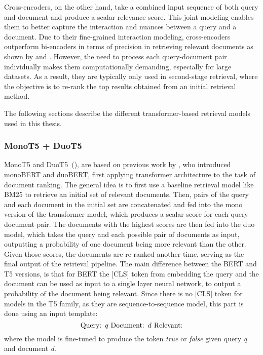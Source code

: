 Cross-encoders, on the other hand, take a combined input sequence of both query and document and produce a scalar relevance score.
This joint modeling enables them to better capture the interaction and nuances between a query and a document.
Due to their fine-grained interaction modeling, cross-encoders outperform bi-encoders in terms of precision in retrieving relevant documents as shown by \cite{thakur:2020:Augmented} and \cite{rosa:2022:In}.
However, the need to process each query-document pair individually makes them computationally demanding, especially for large datasets.
As a result, they are typically only used in second-stage retrieval, where the objective is to re-rank the top results obtained from an initial retrieval method.

The following sections describe the different transformer-based retrieval models used in this thesis.
\subsubsection{MonoT5 + DuoT5}\label{sec:monot5-duot5}
MonoT5 and DuoT5~(\cite{roberts:2019:Exploring}), are based on previous work by \cite{nogueira:2019:Multi}, who introduced monoBERT and duoBERT, first applying transformer architecture to the task of document ranking.
The general idea is to first use a baseline retrieval model like BM25 to retrieve an initial set of relevant documents.
Then, pairs of the query and each document in the initial set are concatenated and fed into the mono version of the transformer model, which produces a scalar score for each query-document pair.
The documents with the highest scores are then fed into the duo model, which takes the query and each possible pair of documents as input, outputting a probability of one document being more relevant than the other.
Given those scores, the documents are re-ranked another time, serving as the final output of the retrieval pipeline.
The main difference between the BERT and T5 versions, is that for BERT the [CLS] token from embedding the query and the document can be used as input to a single layer neural network, to output a probability of the document being relevant.
Since there is no [CLS] token for models in the T5 family, as they are sequence-to-sequence model, this part is done using an input template:
\begin{equation}
    \text{Query: \emph{q} Document: \emph{d} Relevant:}
\end{equation} 
where the model is fine-tuned to produce the token \emph{true} or \emph{false} given query \emph{q} and document \emph{d}.

